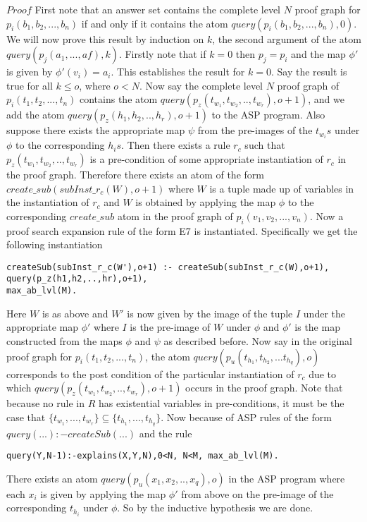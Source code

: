 \documentclass{article}
\begin{document}
\newline
$\textit{Proof}$ First note that an answer set contains the complete level $N$ proof graph for $p_{i}(b_{1},b_{2},...,b_{n})$ if and only if it contains the atom $query(p_{i}(b_{1},b_{2},...,b_{n}),0)$. We will now prove this result by induction on $k$, the second argument of the atom $query(p_{j}(a_{1},...,a{f}),k)$. Firstly note that if $k = 0$ then $p_{j} = p_{i}$ and the map $\phi'$ is given by $\phi'(v_{i}) = a_{i}$. This establishes the result for $k=0$.  Say the result is true for all $k\leq o$, where $o<N$. Now say the complete level $N$ proof graph of $p_{i}(t_{1},t_{2},...,t_{n})$ contains the atom $query(p_{z}(t_{w_{1}},t_{w_{2}},..,t_{w_{r}}),o+1)$, and we add the atom $query(p_{z}(h_{1},h_{2},..,h_{r}),o+1)$ to the ASP program. Also suppose there exists the appropriate map $\psi$ from the pre-images of the $t_{w_{i}}s$ under $\phi$ to the corresponding $h_{i}s$. Then there exists a rule $r_{c}$ such that $p_{z}(t_{w_{1}},t_{w_{2}},..,t_{w_{r}})$ is a pre-condition of some appropriate instantiation of $r_{c}$ in the proof graph. Therefore there exists an atom of the form $create\_sub(subInst\_r_{c}(W),o+1)$ where $W$ is a tuple made up of variables in the instantiation of $r_{c}$ and $W$ is obtained by applying the map $\phi$ to the corresponding $create\_sub$ atom in the proof graph of $p_{i}(v_{1},v_{2},...,v_{n})$. Now a proof search expansion rule of the form E7 is instantiated. Specifically we get the following instantiation \begin{verbatim}
createSub(subInst_r_c(W'),o+1) :- createSub(subInst_r_c(W),o+1), query(p_z(h1,h2,..,hr),o+1),
max_ab_lvl(M).
\end{verbatim}  
Here $W$ is as above and $W'$ is now given by the image of the tuple $I$ under the appropriate map $\phi'$ where $I$ is the pre-image of $W$ under $\phi$ and $\phi'$ is the map constructed from the maps $\phi$ and $\psi$ as described before. Now say in the original proof graph for $p_{i}(t_{1},t_{2},...,t_{n})$, the atom $query(p_{u}(t_{h_{1}},t_{h_{2}},...t_{h_{q}}),o)$ corresponds to the post condition of the particular instantiation of $r_{c}$ due to which $query(p_{z}(t_{w_{1}},t_{w_{2}},..,t_{w_{r}}),o+1)$ occurs in the proof graph. Note that because no rule in $R$ has existential variables in pre-conditions, it must be the case that $\{t_{w_{1}},...,t_{w_{r}}\}\subseteq\{t_{h_{1}},...,t_{h_{q}}\}$. Now because of ASP rules of the form $query(...):-createSub(...)$ and the rule \begin{verbatim}
query(Y,N-1):-explains(X,Y,N),0<N, N<M, max_ab_lvl(M).    \end{verbatim}
There exists an atom $query(p_{u}(x_{1},x_{2},..,x_{q}),o)$ in the ASP program where each $x_{i}$ is given by applying the map $\phi'$ from above on the pre-image of the corresponding $t_{h_{i}}$ under $\phi$. So by the inductive hypothesis we are done.\\
\end{document}
